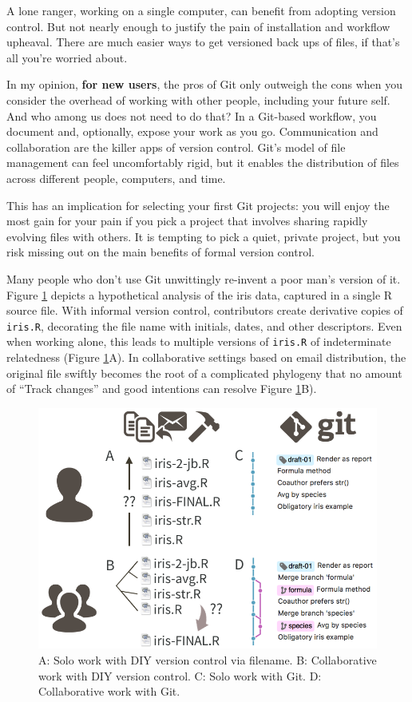 \documentclass[12pt]{article}
\begin{document}
A lone ranger, working on a single computer, can benefit from adopting
version control. But not nearly enough to justify the pain of
installation and workflow upheaval. There are much easier ways to get
versioned back ups of files, if that's all you're worried about.

In my opinion, \textbf{for new users}, the pros of Git only outweigh the
cons when you consider the overhead of working with other people,
including your future self. And who among us does not need to do that?
In a Git-based workflow, you document and, optionally, expose your work
as you go. Communication and collaboration are the killer apps of
version control. Git's model of file management can feel uncomfortably
rigid, but it enables the distribution of files across different people,
computers, and time.

This has an implication for selecting your first Git projects: you will
enjoy the most gain for your pain if you pick a project that involves
sharing rapidly evolving files with others. It is tempting to pick a
quiet, private project, but you risk missing out on the main benefits of
formal version control.

Many people who don't use Git unwittingly re-invent a poor man's version
of it. Figure \ref{fig:diy-vs-git} depicts a hypothetical analysis of
the iris data, captured in a single R source file. With informal version
control, contributors create derivative copies of \texttt{iris.R},
decorating the file name with initials, dates, and other descriptors.
Even when working alone, this leads to multiple versions of
\texttt{iris.R} of indeterminate relatedness (Figure
\ref{fig:diy-vs-git}A). In collaborative settings based on email
distribution, the original file swiftly becomes the root of a
complicated phylogeny that no amount of ``Track changes'' and good
intentions can resolve Figure \ref{fig:diy-vs-git}B).

\begin{figure}
\includegraphics[width=1\linewidth]{diy-vs-git-solo-vs-collab} \caption{\label{fig:diy-vs-git}A: Solo work with DIY version control via filename. B: Collaborative work with DIY version control. C: Solo work with Git. D: Collaborative work with Git.}\label{fig:diy-vs-git}
\end{figure}
\end{document}
